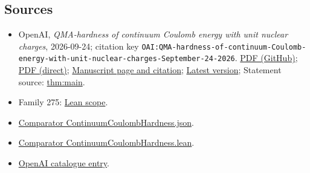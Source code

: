 \documentclass[11pt]{article}
\begin{document}
\subsection{Sources}
\begin{itemize}
\item OpenAI, \emph{QMA-hardness of continuum Coulomb energy with unit nuclear charges}, 2026-09-24; citation key \texttt{OAI:QMA-hardness-of-continuum-Coulomb-energy-with-unit-nuclear-charges-September-24-2026}. \href{https://github.com/openai/math/blob/adc7f1241b42e322a6451854ab7e4b4c146bf78a/preprints/QMA-hardness-of-continuum-Coulomb-energy-with-unit-nuclear-charges-September-24-2026/QMA-hardness-of-continuum-Coulomb-energy-with-unit-nuclear-charges-September-24-2026.pdf}{PDF (GitHub)}; \href{https://github.com/openai/math/raw/adc7f1241b42e322a6451854ab7e4b4c146bf78a/preprints/QMA-hardness-of-continuum-Coulomb-energy-with-unit-nuclear-charges-September-24-2026/QMA-hardness-of-continuum-Coulomb-energy-with-unit-nuclear-charges-September-24-2026.pdf}{PDF (direct)}; \href{https://github.com/openai/math/blob/adc7f1241b42e322a6451854ab7e4b4c146bf78a/preprints/QMA-hardness-of-continuum-Coulomb-energy-with-unit-nuclear-charges-September-24-2026/README.md}{Manuscript page and citation}; \href{https://github.com/openai/math/blob/main/preprints/QMA-hardness-of-continuum-Coulomb-energy-with-unit-nuclear-charges-September-24-2026/QMA-hardness-of-continuum-Coulomb-energy-with-unit-nuclear-charges-September-24-2026.pdf}{Latest version}; Statement source: \href{https://github.com/openai/math/blob/adc7f1241b42e322a6451854ab7e4b4c146bf78a/preprints/QMA-hardness-of-continuum-Coulomb-energy-with-unit-nuclear-charges-September-24-2026/build/introduction.tex\#L91}{thm:main}.
\item Family 275: \href{https://github.com/openai/math/blob/adc7f1241b42e322a6451854ab7e4b4c146bf78a/lean/docs/275.md}{Lean scope}.
\item \href{https://github.com/openai/math/blob/adc7f1241b42e322a6451854ab7e4b4c146bf78a/lean/ComparatorChallenges/ContinuumCoulombHardness.json}{Comparator ContinuumCoulombHardness.json}.
\item \href{https://github.com/openai/math/blob/adc7f1241b42e322a6451854ab7e4b4c146bf78a/lean/ComparatorChallenges/ContinuumCoulombHardness.lean}{Comparator ContinuumCoulombHardness.lean}.
\item \href{https://github.com/openai/math/blob/adc7f1241b42e322a6451854ab7e4b4c146bf78a/CONTENTS.md}{OpenAI catalogue entry}.
\end{itemize}
\end{document}
